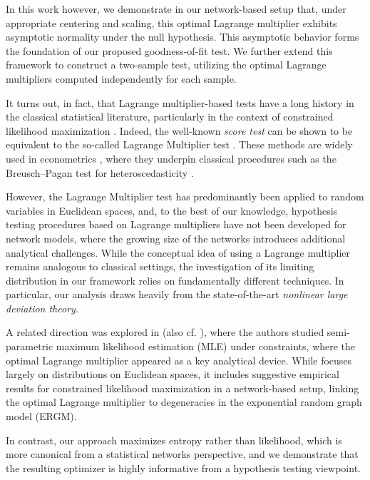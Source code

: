 \documentclass[12pt]{article}
\numberwithin{equation}{section}
\begin{document}
In this work however, we demonstrate in our network-based setup that, under appropriate centering and scaling, this optimal Lagrange multiplier exhibits asymptotic normality under the null hypothesis. This asymptotic behavior forms the foundation of our proposed goodness-of-fit test. We further extend this framework to construct a two-sample test, utilizing the optimal Lagrange multipliers computed independently for each sample.

It turns out, in fact, that Lagrange multiplier-based tests have a long history in the classical statistical literature, particularly in the context of constrained likelihood maximization \cite{silvey1958, silvey1959}. Indeed, the well-known {\it score test} can be shown to be equivalent to the so-called Lagrange Multiplier test \cite{silvey1959}. These methods are widely used in econometrics \cite{LM_econ}, where they underpin classical procedures such as the Breusch–Pagan test for heteroscedasticity \cite{bp_test}. 

However, the Lagrange Multiplier test has predominantly been applied to random variables in Euclidean spaces, and, to the best of our knowledge, hypothesis testing procedures based on Lagrange multipliers have not been developed for network models, where the growing size of the networks introduces additional analytical challenges. While the conceptual idea of using a Lagrange multiplier remains analogous to classical settings, the investigation of its limiting distribution in our framework relies on fundamentally different techniques. In particular, our analysis draws heavily from the state-of-the-art {\it nonlinear large deviation theory}.

A related direction was explored in \cite{ghosh2023} (also cf. \cite{ghosh_abc}), where the authors studied semi-parametric maximum likelihood estimation (MLE) under constraints, where the optimal Lagrange multiplier appeared as a key analytical device. While \cite{ghosh2023} focuses largely on distributions on Euclidean spaces, it includes suggestive empirical results for constrained likelihood maximization in a network-based setup, linking the optimal Lagrange multiplier to degeneracies in the exponential random graph model (ERGM). 

In contrast, our approach maximizes entropy rather than likelihood, which is more canonical from a statistical networks perspective, and we demonstrate that the resulting optimizer is highly informative from a hypothesis testing viewpoint.\\
\end{document}
